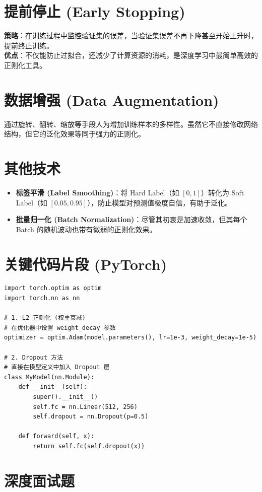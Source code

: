 \documentclass[12pt, a4paper]{article}
\begin{document}
\section{提前停止 (Early Stopping)}
\textbf{策略}：在训练过程中监控验证集的误差，当验证集误差不再下降甚至开始上升时，提前终止训练。
\\ \textbf{优点}：不仅能防止过拟合，还减少了计算资源的消耗，是深度学习中最简单高效的正则化工具。

\section{数据增强 (Data Augmentation)}
通过旋转、翻转、缩放等手段人为增加训练样本的多样性。虽然它不直接修改网络结构，但它的泛化效果等同于强力的正则化。

\section{其他技术}
\begin{itemize}
    \item \textbf{标签平滑 (Label Smoothing)}：将 Hard Label（如 $[0, 1]$）转化为 Soft Label（如 $[0.05, 0.95]$），防止模型对预测值极度自信，有助于泛化。
    \item \textbf{批量归一化 (Batch Normalization)}：尽管其初衷是加速收敛，但其每个 Batch 的随机波动也带有微弱的正则化效果。
\end{itemize}

\section{关键代码片段 (PyTorch)}
\begin{lstlisting}
import torch.optim as optim
import torch.nn as nn

# 1. L2 正则化 (权重衰减)
# 在优化器中设置 weight_decay 参数
optimizer = optim.Adam(model.parameters(), lr=1e-3, weight_decay=1e-5)

# 2. Dropout 方法
# 直接在模型定义中加入 Dropout 层
class MyModel(nn.Module):
    def __init__(self):
        super().__init__()
        self.fc = nn.Linear(512, 256)
        self.dropout = nn.Dropout(p=0.5)
        
    def forward(self, x):
        return self.fc(self.dropout(x))
\end{lstlisting}

\section{深度面试题}
\end{document}
